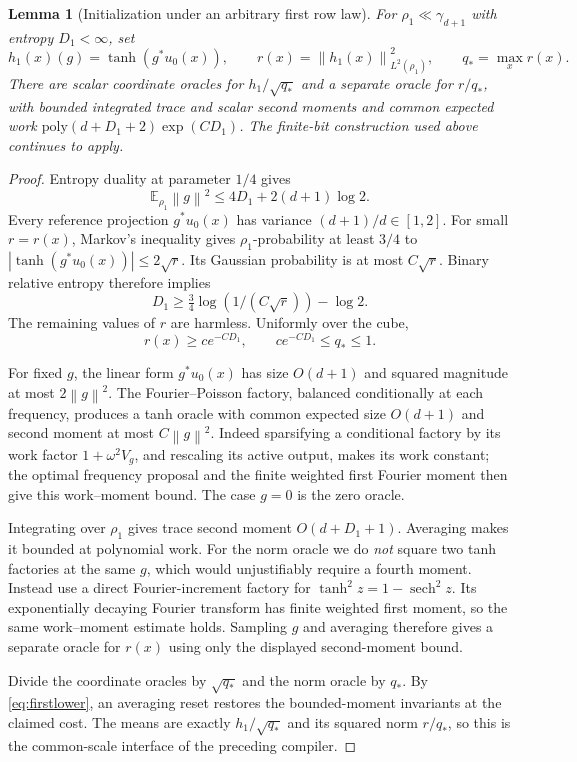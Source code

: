\documentclass[11pt]{article}
\newtheorem{lemma}[theorem]{Lemma}
\newcommand{\E}{\mathbb E}
\newcommand{\norm}[1]{\left\lVert #1\right\rVert}
\newcommand{\poly}{\mathrm{poly}}
\begin{document}
\begin{lemma}[Initialization under an arbitrary first row law]
\label{lem:firstrow}
For $\rho_1\ll\gamma_{d+1}$ with entropy $D_1<\infty$, set
\[
 h_1(x)(g)=\tanh(g^*u_0(x)),\qquad
 r(x)=\norm{h_1(x)}_{L^2(\rho_1)}^2,\qquad q_*=\max_x r(x).
\]
There are scalar coordinate oracles for $h_1/\sqrt{q_*}$ and a separate oracle for $r/q_*$, with bounded integrated trace and scalar second moments and common expected work
$\poly(d+D_1+2)\exp(CD_1)$.
The finite-bit construction used above continues to apply.
\end{lemma}
\begin{proof}
Entropy duality at parameter $1/4$ gives
\[
 \E_{\rho_1}\norm g^2\le4D_1+2(d+1)\log2.
\]
Every reference projection $g^*u_0(x)$ has variance $(d+1)/d\in[1,2]$. For small $r=r(x)$, Markov's inequality gives $\rho_1$-probability at least $3/4$ to
$|\tanh(g^*u_0(x))|\le2\sqrt r$. Its Gaussian probability is at most $C\sqrt r$. Binary relative entropy therefore implies
\[
 D_1\ge\tfrac34\log(1/(C\sqrt r))-\log2.
\]
The remaining values of $r$ are harmless. Uniformly over the cube,
\begin{equation}
 r(x)\ge c e^{-CD_1},\qquad c e^{-CD_1}\le q_*\le1.
 \label{eq:firstlower}
\end{equation}

For fixed $g$, the linear form $g^*u_0(x)$ has size $O(d+1)$ and squared magnitude at most $2\norm g^2$. The Fourier--Poisson factory, balanced conditionally at each frequency, produces a tanh oracle with common expected size $O(d+1)$ and second moment at most $C\norm g^2$. Indeed sparsifying a conditional factory by its work factor $1+\omega^2V_g$, and rescaling its active output, makes its work constant; the optimal frequency proposal and the finite weighted first Fourier moment then give this work--moment bound. The case $g=0$ is the zero oracle.

Integrating over $\rho_1$ gives trace second moment $O(d+D_1+1)$. Averaging makes it bounded at polynomial work. For the norm oracle we do \emph{not} square two tanh factories at the same $g$, which would unjustifiably require a fourth moment. Instead use a direct Fourier-increment factory for
$\tanh^2 z=1-\operatorname{sech}^2z$. Its exponentially decaying Fourier transform has finite weighted first moment, so the same work--moment estimate holds. Sampling $g$ and averaging therefore gives a separate oracle for $r(x)$ using only the displayed second-moment bound.

Divide the coordinate oracles by $\sqrt{q_*}$ and the norm oracle by $q_*$. By \eqref{eq:firstlower}, an averaging reset restores the bounded-moment invariants at the claimed cost. The means are exactly $h_1/\sqrt{q_*}$ and its squared norm $r/q_*$, so this is the common-scale interface of the preceding compiler.


\end{proof}
\end{document}
